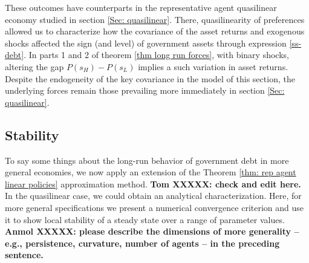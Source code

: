\documentclass[thmsb,11pt]{article}
\begin{document}
  These outcomes have  counterparts in  the representative agent quasilinear economy studied in section \ref{Sec: quasilinear}.
  There, quasilinearity  of preferences allowed us to characterize how the covariance of the asset returns
  and  exogenous shocks affected the sign (and level) of government assets through expression \eqref{ss-debt}.
  In parts 1 and 2 of theorem \ref{thm long run forces}, with binary shocks,  altering the gap $P(s_H)-P(s_L)$ implies  a
  such  variation in asset returns. Despite the endogeneity of the key covariance in the model of this section,
  the  underlying forces remain those prevailing more immediately in section \ref{Sec: quasilinear}.



\subsection{Stability}\label{sec:stability}
To say some things about the long-run behavior of government debt   in more general  economies, we now apply an extension of  the Theorem \ref{thm: rep agent linear policies}  approximation method.
 \textbf{Tom XXXXX: check and edit here.}
 In the quasilinear case, we could obtain an analytical characterization.  Here,
for more general specifications we present a numerical  convergence criterion and use it to  show local stability of a steady state over a range of parameter values. \textbf{Anmol XXXXX: please describe the dimensions of more generality -- e.g., persistence, curvature, number of agents -- 
in the preceding sentence.}
\end{document}
